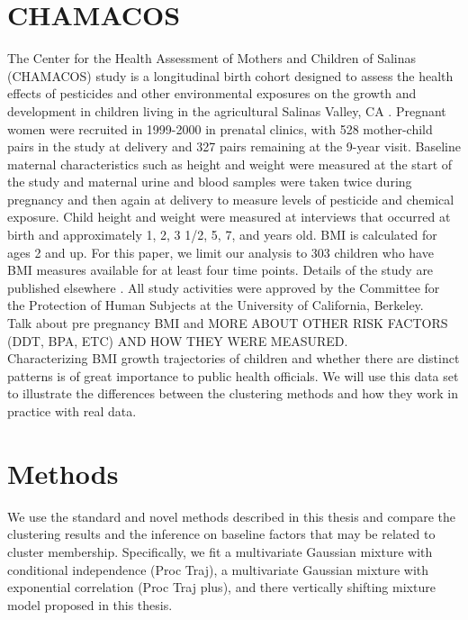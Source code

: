 \section{CHAMACOS}
The Center for the Health Assessment of Mothers and Children of Salinas (CHAMACOS) study is a longitudinal birth cohort designed to assess the health effects of pesticides and other environmental exposures on the growth and development in children living in the agricultural Salinas Valley, CA \cite{eskenazi2004,eskenazi2005}. Pregnant women were recruited in 1999-2000 in prenatal clinics, with 528 mother-child pairs in the study at delivery and 327 pairs remaining at the 9-year visit. Baseline maternal characteristics such as height and weight were measured at the start of the study and maternal urine and blood samples were taken twice during pregnancy and then again at delivery to measure levels of pesticide and chemical exposure. Child height and weight  were measured at interviews that occurred at birth and approximately 1, 2, 3 1/2, 5, 7, and years old. BMI is calculated for ages 2 and up. For this paper, we limit our analysis to 303 children who have BMI measures available for at least four time points. Details of the study are published elsewhere \cite{eskenazi2003}. All study activities were approved by the Committee for the Protection of Human Subjects at the University of California, Berkeley. \\

Talk about pre pregnancy BMI and MORE ABOUT OTHER RISK FACTORS (DDT, BPA, ETC) AND HOW THEY WERE MEASURED.\\

Characterizing BMI growth trajectories of children and whether there are distinct patterns is of great importance to public health officials. We will use this data set to illustrate the differences between the clustering methods and how they work in practice with real data.\\

\section{Methods}
We use the standard and novel methods described in this thesis and compare the clustering results and the inference on baseline factors that may be related to cluster membership. Specifically, we fit a multivariate Gaussian mixture with conditional independence (Proc Traj), a multivariate Gaussian mixture with exponential correlation (Proc Traj plus), and there vertically shifting mixture model proposed in this thesis.\\

